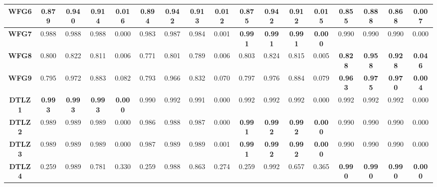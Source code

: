 \begin{table*}[t]
\begin{tabular}{cc|c|c|c|c|c|c|c|c|c|c|c|c|c|c|c}
\multicolumn{1}{c|}{\textbf{WFG6}}  & \textbf{0.879} & \textbf{0.940} & \textbf{0.914} & \textbf{0.016} & \textbf{0.894} & \textbf{0.942} & \textbf{0.913} & \textbf{0.012} & \textbf{0.875} & \textbf{0.942} & \textbf{0.912} & \textbf{0.015} & 0.855          & 0.888          & 0.868          & 0.007          \\ \hline
\multicolumn{1}{c|}{\textbf{WFG7}}  & 0.988          & 0.988          & 0.988          & 0.000          & 0.983          & 0.987          & 0.984          & 0.001          & \textbf{0.991} & \textbf{0.991} & \textbf{0.991} & \textbf{0.000} & 0.990          & 0.990          & 0.990          & 0.000          \\ \hline
\multicolumn{1}{c|}{\textbf{WFG8}}  & 0.800          & 0.822          & 0.811          & 0.006          & 0.771          & 0.801          & 0.789          & 0.006          & 0.803          & 0.824          & 0.815          & 0.005          & \textbf{0.828} & \textbf{0.958} & \textbf{0.928} & \textbf{0.046} \\ \hline
\multicolumn{1}{c|}{\textbf{WFG9}}  & 0.795          & 0.972          & 0.883          & 0.082          & 0.793          & 0.966          & 0.832          & 0.070          & 0.797          & 0.976          & 0.884          & 0.079          & \textbf{0.963} & \textbf{0.975} & \textbf{0.970} & \textbf{0.004} \\ \hline
\multicolumn{1}{c|}{\textbf{DTLZ1}} & \textbf{0.993} & \textbf{0.993} & \textbf{0.993} & \textbf{0.000} & 0.990          & 0.992          & 0.991          & 0.000          & 0.992          & 0.992          & 0.992          & 0.000          & 0.992          & 0.992          & 0.992          & 0.000          \\ \hline
\multicolumn{1}{c|}{\textbf{DTLZ2}} & 0.989          & 0.989          & 0.989          & 0.000          & 0.986          & 0.988          & 0.987          & 0.000          & \textbf{0.991} & \textbf{0.992} & \textbf{0.992} & \textbf{0.000} & 0.990          & 0.990          & 0.990          & 0.000          \\ \hline
\multicolumn{1}{c|}{\textbf{DTLZ3}} & 0.989          & 0.989          & 0.989          & 0.000          & 0.987          & 0.989          & 0.989          & 0.001          & \textbf{0.991} & \textbf{0.992} & \textbf{0.992} & \textbf{0.000} & 0.990          & 0.990          & 0.990          & 0.000          \\ \hline
\multicolumn{1}{c|}{\textbf{DTLZ4}} & 0.259          & 0.989          & 0.781          & 0.330          & 0.259          & 0.988          & 0.863          & 0.274          & 0.259          & 0.992          & 0.657          & 0.365          & \textbf{0.990} & \textbf{0.990} & \textbf{0.990} & \textbf{0.000} \\ \hline

\end{tabular}
\end{table*}
